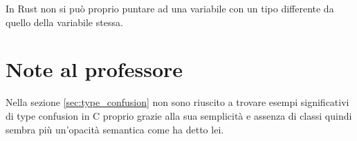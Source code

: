 \documentclass{article}
\begin{document}
In Rust non si può proprio puntare ad una variabile con un tipo differente da quello della variabile stessa.




\section{Note al professore}
Nella sezione \ref{sec:type_confusion} non sono riuscito a trovare esempi significativi di type confusion in C proprio grazie alla sua semplicità e assenza di classi quindi sembra più un'opacità semantica come ha detto lei.

\clearpage
%

{}
\end{document}
